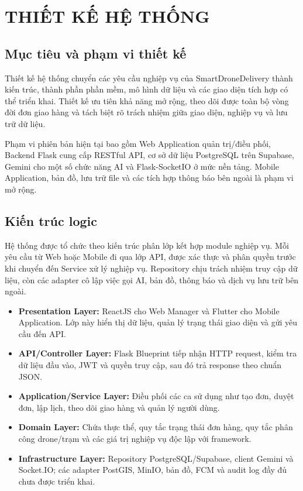 \chapter{THIẾT KẾ HỆ THỐNG}

\section{Mục tiêu và phạm vi thiết kế}

Thiết kế hệ thống chuyển các yêu cầu nghiệp vụ của SmartDroneDelivery thành kiến trúc, thành phần phần mềm, mô hình dữ liệu và các giao diện tích hợp có thể triển khai. Thiết kế ưu tiên khả năng mở rộng, theo dõi được toàn bộ vòng đời đơn giao hàng và tách biệt rõ trách nhiệm giữa giao diện, nghiệp vụ và lưu trữ dữ liệu.

Phạm vi phiên bản hiện tại bao gồm Web Application quản trị/điều phối, Backend Flask cung cấp RESTful API, cơ sở dữ liệu PostgreSQL trên Supabase, Gemini cho một số chức năng AI và Flask-SocketIO ở mức nền tảng. Mobile Application, bản đồ, lưu trữ file và các tích hợp thông báo bên ngoài là phạm vi mở rộng.

\section{Kiến trúc logic}

Hệ thống được tổ chức theo kiến trúc phân lớp kết hợp module nghiệp vụ. Mỗi yêu cầu từ Web hoặc Mobile đi qua lớp API, được xác thực và phân quyền trước khi chuyển đến Service xử lý nghiệp vụ. Repository chịu trách nhiệm truy cập dữ liệu, còn các adapter cô lập việc gọi AI, bản đồ, thông báo và dịch vụ lưu trữ bên ngoài.

\begin{itemize}
	\item \textbf{Presentation Layer:} ReactJS cho Web Manager và Flutter cho Mobile Application. Lớp này hiển thị dữ liệu, quản lý trạng thái giao diện và gửi yêu cầu đến API.
	\item \textbf{API/Controller Layer:} Flask Blueprint tiếp nhận HTTP request, kiểm tra dữ liệu đầu vào, JWT và quyền truy cập, sau đó trả response theo chuẩn JSON.
	\item \textbf{Application/Service Layer:} Điều phối các ca sử dụng như tạo đơn, duyệt đơn, lập lịch, theo dõi giao hàng và quản lý người dùng.
	\item \textbf{Domain Layer:} Chứa thực thể, quy tắc trạng thái đơn hàng, quy tắc phân công drone/trạm và các giá trị nghiệp vụ độc lập với framework.
	\item \textbf{Infrastructure Layer:} Repository PostgreSQL/Supabase, client Gemini và Socket.IO; các adapter PostGIS, MinIO, bản đồ, FCM và audit log đầy đủ chưa được triển khai.
\end{itemize}

